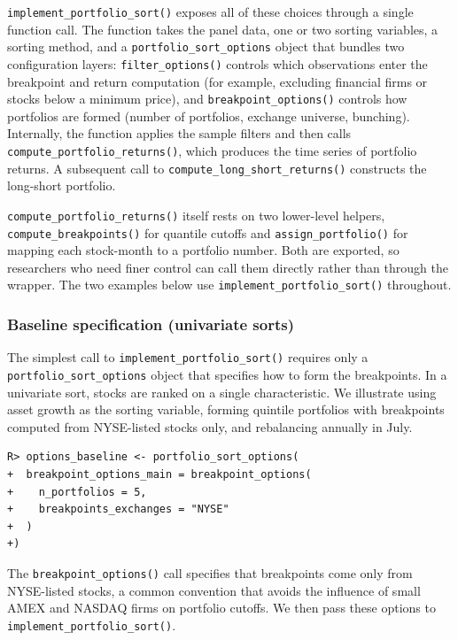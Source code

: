 \documentclass[
  article]{jss}
\begin{document}
\texttt{implement\_portfolio\_sort()} exposes all of these choices
through a single function call. The function takes the panel data, one
or two sorting variables, a sorting method, and a
\texttt{portfolio\_sort\_options} object that bundles two configuration
layers: \texttt{filter\_options()} controls which observations enter the
breakpoint and return computation (for example, excluding financial
firms or stocks below a minimum price), and
\texttt{breakpoint\_options()} controls how portfolios are formed
(number of portfolios, exchange universe, bunching). Internally, the
function applies the sample filters and then calls
\texttt{compute\_portfolio\_returns()}, which produces the time series
of portfolio returns. A subsequent call to
\texttt{compute\_long\_short\_returns()} constructs the long-short
portfolio.

\texttt{compute\_portfolio\_returns()} itself rests on two lower-level
helpers, \texttt{compute\_breakpoints()} for quantile cutoffs and
\texttt{assign\_portfolio()} for mapping each stock-month to a portfolio
number. Both are exported, so researchers who need finer control can
call them directly rather than through the wrapper. The two examples
below use \texttt{implement\_portfolio\_sort()} throughout.

\subsubsection{Baseline specification (univariate
sorts)}\label{sec-baseline-sorts}

The simplest call to \texttt{implement\_portfolio\_sort()} requires only
a \texttt{portfolio\_sort\_options} object that specifies how to form
the breakpoints. In a univariate sort, stocks are ranked on a single
characteristic. We illustrate using asset growth as the sorting
variable, forming quintile portfolios with breakpoints computed from
NYSE-listed stocks only, and rebalancing annually in July.

\begin{verbatim}
R> options_baseline <- portfolio_sort_options(
+  breakpoint_options_main = breakpoint_options(
+    n_portfolios = 5,
+    breakpoints_exchanges = "NYSE"
+  )
+)
\end{verbatim}

The \texttt{breakpoint\_options()} call specifies that breakpoints come
only from NYSE-listed stocks, a common convention that avoids the
influence of small AMEX and NASDAQ firms on portfolio cutoffs. We then
pass these options to \texttt{implement\_portfolio\_sort()}.
\end{document}
